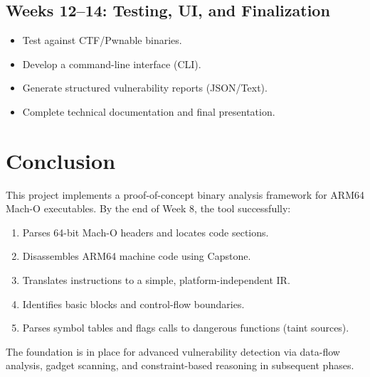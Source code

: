 \documentclass[12pt,a4paper]{article}
\begin{document}
\subsection{Weeks 12--14: Testing, UI, and Finalization}

\begin{itemize}
  \item Test against CTF/Pwnable binaries.
  \item Develop a command-line interface (CLI).
  \item Generate structured vulnerability reports (JSON/Text).
  \item Complete technical documentation and final presentation.
\end{itemize}

\newpage

\section{Conclusion}

This project implements a proof-of-concept binary analysis framework for ARM64 Mach-O executables. By the end of Week 8, the tool successfully:

\begin{enumerate}
  \item Parses 64-bit Mach-O headers and locates code sections.
  \item Disassembles ARM64 machine code using Capstone.
  \item Translates instructions to a simple, platform-independent IR.
  \item Identifies basic blocks and control-flow boundaries.
  \item Parses symbol tables and flags calls to dangerous functions (taint sources).
\end{enumerate}

The foundation is in place for advanced vulnerability detection via data-flow analysis, gadget scanning, and constraint-based reasoning in subsequent phases.
\end{document}
